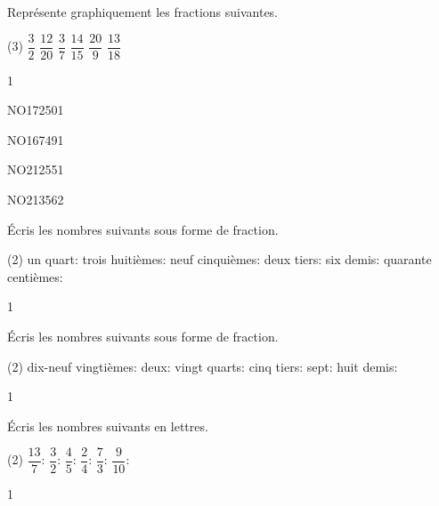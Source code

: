 \documentclass[a4paper,11pt]{report}
\begin{document}
\vfill
\begin{exo}{
Représente graphiquement les fractions suivantes.
	\begin{tasks}(3)
		\task $\dfrac{3}{2}$
		\task $\dfrac{12}{20}$
		\task $\dfrac{3}{7}$
		\task $\dfrac{14}{15}$
		\task $\dfrac{20}{9}$
		\task $\dfrac{13}{18}$
	\end{tasks}
 \vspace{1pt}
}{1}\end{exo}

\vfill
\begin{exol}{NO172}{50}{1}
\end{exol}
\vfill
\begin{exol}{NO167}{49}{1}
\end{exol}
\vfill
\begin{exol}{NO212}{55}{1}
\end{exol}
\vfill
\begin{exol}{NO213}{56}{2}
\end{exol}

\newpage
\begin{exop}{
Écris les nombres suivants sous forme de fraction.
\begin{tasks}(2)
    \task un quart: \hrulefill
    \task trois huitièmes: \hrulefill
    \task neuf cinquièmes: \hrulefill
    \task deux tiers: \hrulefill
    \task six demis: \hrulefill
    \task quarante centièmes: \hrulefill
\end{tasks}
 \vspace{1pt}
}{1}\end{exop}


\begin{exop}{
Écris les nombres suivants sous forme de fraction.
\begin{tasks}(2)
    \task dix-neuf vingtièmes: \hrulefill
    \task deux: \hrulefill
    \task vingt quarts: \hrulefill
    \task cinq tiers: \hrulefill
    \task sept: \hrulefill
    \task huit demis: \hrulefill
\end{tasks}
 \vspace{1pt}
}{1}\end{exop}

\begin{exop}{
Écris les nombres suivants en lettres.
\begin{tasks}(2)
    \task $\dfrac{13}{7}$: \hrulefill
    \task $\dfrac{3}{2}$: \hrulefill
    \task $\dfrac{4}{5}$: \hrulefill
    \task $\dfrac{2}{4}$: \hrulefill
    \task $\dfrac{7}{3}$: \hrulefill
    \task $\dfrac{9}{10}$: \hrulefill
\end{tasks}
 \vspace{1pt}

}{1}\end{exop}
\end{document}
